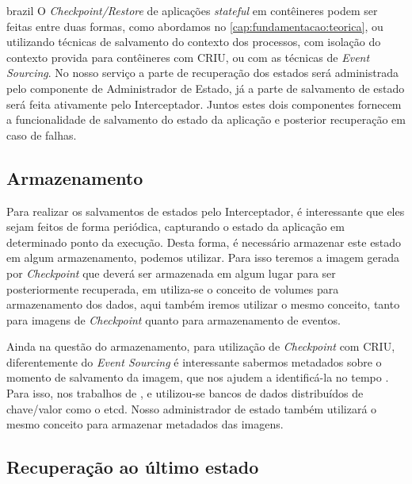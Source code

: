 \begin{otherlanguage*}{brazil}
O \textit{Checkpoint/Restore} de aplicações \textit{stateful} em contêineres podem ser
feitas entre duas formas, como abordamos no \ref{cap:fundamentacao:teorica}, ou
utilizando técnicas de salvamento do contexto dos processos, com isolação do contexto
provida para contêineres \cite{muller2022architecture} com CRIU, ou com as técnicas de
\textit{Event Sourcing}. No nosso serviço a parte de recuperação dos estados será
administrada pelo componente de Administrador de Estado, já a parte de salvamento de estado
será feita ativamente pelo Interceptador. Juntos estes dois componentes fornecem a
funcionalidade de salvamento do estado da aplicação e posterior recuperação em caso
de falhas.

\subsection{Armazenamento}

Para realizar os salvamentos de estados pelo Interceptador, é interessante que eles sejam
feitos de forma periódica, capturando o estado da aplicação em determinado ponto da execução.
Desta forma, é necessário armazenar este estado em algum armazenamento, podemos utilizar. Para
isso teremos a imagem gerada por \textit{Checkpoint} que deverá ser armazenada em algum lugar
para ser posteriormente recuperada, em \cite{vayghan2021kubernetes} utiliza-se o conceito de
volumes para armazenamento dos dados, aqui também iremos utilizar o mesmo conceito, tanto para
imagens de \textit{Checkpoint} quanto para armazenamento de eventos.

Ainda na questão do armazenamento, para utilização de \textit{Checkpoint} com CRIU,
diferentemente do \textit{Event Sourcing} é interessante sabermos metadados sobre o momento
de salvamento da imagem, que nos ajudem a identificá-la no tempo \cite{oh2018stateful}
\cite{muller2022architecture} \cite{Chen2015/10}. Para isso, nos trabalhos de
\cite{muller2022architecture}, \cite{oh2018stateful} e \cite{Chen2015/10} utilizou-se
bancos de dados distribuídos de chave/valor como o etcd. Nosso administrador de estado também
utilizará o mesmo conceito para armazenar metadados das imagens.

\subsection{Recuperação ao último estado}


\end{otherlanguage*}
